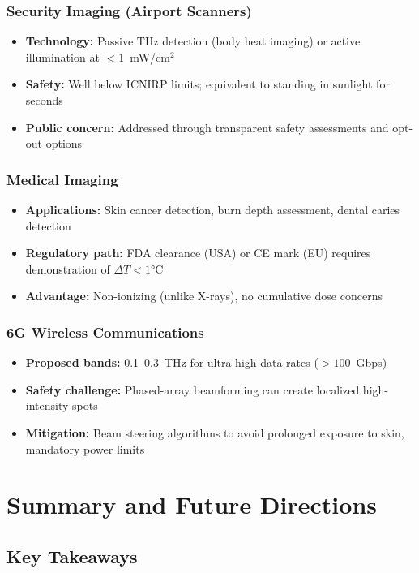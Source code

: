 \subsubsection{Security Imaging (Airport Scanners)}
\begin{itemize}
\item \textbf{Technology:} Passive THz detection (body heat imaging) or active illumination at $<1$~mW/cm$^2$
\item \textbf{Safety:} Well below ICNIRP limits; equivalent to standing in sunlight for seconds
\item \textbf{Public concern:} Addressed through transparent safety assessments and opt-out options
\end{itemize}

\subsubsection{Medical Imaging}
\begin{itemize}
\item \textbf{Applications:} Skin cancer detection, burn depth assessment, dental caries detection
\item \textbf{Regulatory path:} FDA clearance (USA) or CE mark (EU) requires demonstration of $\Delta T < 1°$C
\item \textbf{Advantage:} Non-ionizing (unlike X-rays), no cumulative dose concerns
\end{itemize}

\subsubsection{6G Wireless Communications}
\begin{itemize}
\item \textbf{Proposed bands:} 0.1--0.3~THz for ultra-high data rates ($>100$~Gbps)
\item \textbf{Safety challenge:} Phased-array beamforming can create localized high-intensity spots
\item \textbf{Mitigation:} Beam steering algorithms to avoid prolonged exposure to skin, mandatory power limits
\end{itemize}

\section{Summary and Future Directions}

\subsection{Key Takeaways}

